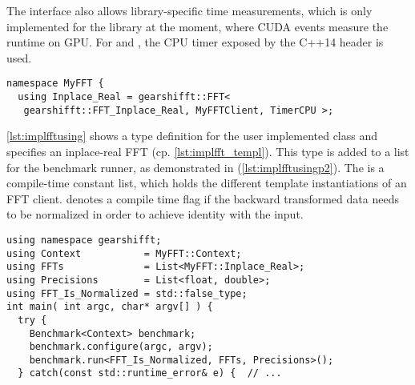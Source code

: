 The \gearshifft{} interface also allows library-specific time measurements, which is only implemented for the \cufft{} library at the moment, where CUDA events measure the runtime on GPU. For \fftw{} and \clfft{}, the CPU timer exposed by the C++14  header is used.

\begin{lstlisting}[caption={Define FFT client types for corresponding FFTs},label={lst:implfftusing}]
namespace MyFFT { 
  using Inplace_Real = gearshifft::FFT<
   gearshifft::FFT_Inplace_Real, MyFFTClient, TimerCPU >;
\end{lstlisting}

\cref{lst:implfftusing} shows a type definition for the user implemented class  and specifies an inplace-real FFT (cp. \cref{lst:implfft_templ}).
This type is added to a list for the benchmark runner, as demonstrated in  (\cref{lst:implfftusingp2}). The  is a compile-time constant list, which holds the different template instantiations of an FFT client.  denotes a compile time flag if the backward transformed data needs to be normalized in order to achieve identity with the input.

\begin{lstlisting}[caption={Using FFT client types to run the benchmarks},label={lst:implfftusingp2}]
using namespace gearshifft;
using Context           = MyFFT::Context;         
using FFTs              = List<MyFFT::Inplace_Real>;
using Precisions        = List<float, double>;   
using FFT_Is_Normalized = std::false_type;
int main( int argc, char* argv[] ) {                                                        
  try {                                                  
    Benchmark<Context> benchmark;
    benchmark.configure(argc, argv);                     
    benchmark.run<FFT_Is_Normalized, FFTs, Precisions>();
  } catch(const std::runtime_error& e) {  // ...
\end{lstlisting}

